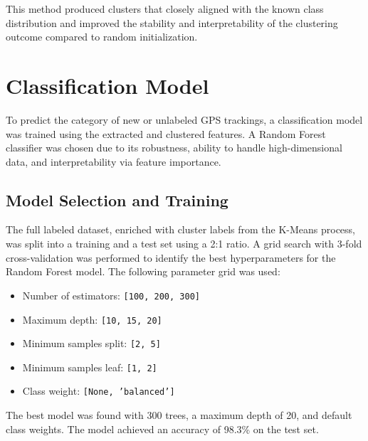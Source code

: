 \documentclass[a4paper,12pt,twoside]{scrreprt}
\begin{document}
This method produced clusters that closely aligned with the known class
distribution and improved the stability and interpretability of the clustering
outcome compared to random initialization.

\section{Classification Model}
To predict the category of new or unlabeled GPS trackings, a classification
model was trained using the extracted and clustered features. A Random Forest
classifier was chosen due to its robustness, ability to handle high-dimensional
data, and interpretability via feature importance.

\subsection{Model Selection and Training}

The full labeled dataset, enriched with cluster labels from the K-Means
process, was split into a training and a test set using a 2:1 ratio. A grid
search with 3-fold cross-validation was performed to identify the best
hyperparameters for the Random Forest model. The following parameter grid was
used:

\begin{itemize}
  \item Number of estimators: \texttt{[100, 200, 300]}
  \item Maximum depth: \texttt{[10, 15, 20]}
  \item Minimum samples split: \texttt{[2, 5]}
  \item Minimum samples leaf: \texttt{[1, 2]}
  \item Class weight: \texttt{[None, 'balanced']}
\end{itemize}

The best model was found with 300 trees, a maximum depth of 20, and default
class weights. The model achieved an accuracy of
98.3\% on the test set.



\end{document}
